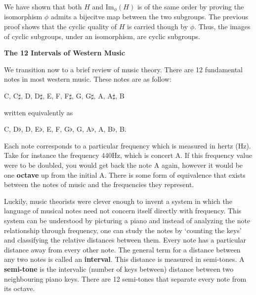 \documentclass[12pt, a4paper]{article}
\begin{document}
    We have shown that both $H$ and Im$_{\phi}(H)$ is of the same order by proving the isomorphism $\phi$ admits a bijecitve map between the two subgroups. The previous proof shows that the cyclic quality of $H$ is carried though by $\phi$. Thus, the images of cyclic subgroups, under an isomorphism, are cyclic subgroups.\par
    



\newpage

\begin{flushleft}
    
    \large{\textbf{The 12 Intervals of Western Music}}
    
\end{flushleft}

    We transition now to a brief review of music theory. There are 12 fundamental notes in most western music. These notes are as follow:\par
    
\vspace{4mm}

        \centerline{C,  C$\sharp$, D,  D$\sharp$, E, F,  F$\sharp$, G,  G$\sharp$, A,  A$\sharp$, B}
        
\vspace{4mm}

    written equivalently as\par
    
\vspace{4mm}

        \centerline{C, D$\flat$, D, E$\flat$, E, F, G$\flat$, G, A$\flat$, A, B$\flat$, B.}
        
\vspace{4mm}

    Each note corresponds to a particular frequency which is measured in hertz (Hz). Take for instance the frequency 440Hz, which is concert A. If this frequency value were to be doubled, you would get back the note A again, however it would be one \textbf{octave} up from the initial A. There is some form of equivalence that exists between the notes of music and the frequencies they represent.\par
    
    Luckily, music theorists were clever enough to invent a system in which the language of musical notes need not concern itself directly with frequency. This system can be understood by picturing a piano and instead of analyzing the note relationship through frequency, one can study the notes by `counting the keys' and classifying the relative distances between them. Every note has a particular distance away from every other note. The general term for a distance between any two notes is called an \textbf{interval}. This distance is measured in semi-tones. A \textbf{semi-tone} is the intervalic (number of keys between) distance between two neighbouring piano keys. There are 12 semi-tones that separate every note from its octave.\par
    
\end{document}
